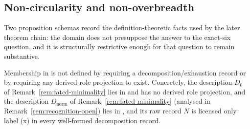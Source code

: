 \subsection{Non-circularity and non-overbreadth}\label{subsec:non-circularity-non-overbreadth}

Two proposition schemas record the definition-theoretic facts used by
the later theorem chain: the domain does not presuppose the answer to
the exact-six question, and it is structurally restrictive enough
for that question to remain substantive.

\begin{proposition}\label{prop:non-circularity}
Membership in \FATCD{} is not defined by requiring a
decomposition/exhaustion record or by requiring any derived role
projection to exist. Concretely, the description \(D_0\) of
Remark~\ref{rem:fatcd-minimality} lies in \FATCD{} and has no derived role
projection, and the description \(D_{\mathrm{norm}}\) of
Remark~\ref{rem:fatcd-minimality} (analysed in
Remark~\ref{rem:recognition-open}) lies in \FATCD{}, and its raw record \(N\)
is licensed only label (x) in every well-formed decomposition record.
\end{proposition}

